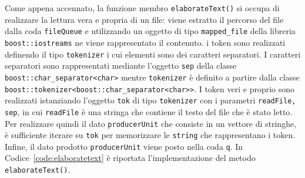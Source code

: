 \documentclass[10pt,twocolumn,letterpaper]{article}
\begin{document}
Come appena accennato, la funzione membro \texttt{elaborateText()} si occupa di realizzare la lettura vera e propria di un file: viene estratto il percorso del file dalla coda
\texttt{fileQueue} e utilizzando un oggetto di tipo \texttt{mapped\_file} della libreria \texttt{boost::iostreams} ne viene rappresentato il contenuto. i token sono realizzati definendo il tipo \texttt{tokenizer}
i cui elementi sono dei caratteri separatori. I caratteri separatori sono rappresentati mediante l'oggetto \texttt{sep} della classe \texttt{boost::char\_separator<char>} mentre \texttt{tokenizer} è 
definito a partire dalla classe \texttt{boost::tokenizer<boost::char\_separator<char>>}. I token veri e proprio sono realizzati istanziando l'oggetto \texttt{tok} di tipo \texttt{tokenizer} con i 
parametri \texttt{{readFile, sep}}, in cui \texttt{readFile} è una stringa che contiene il testo del file che è stato letto. Per realizzare quindi il dato \texttt{producerUnit} che consiste in un 
vettore di stringhe, è sufficiente iterare su \texttt{tok} per memorizzare le \texttt{string} che rappresentano i token. Infine, il dato prodotto \texttt{producerUnit} viene posto nella coda \texttt{q}. In Codice~\ref{code:elaboratetext} è riportata l'implementazione del metodo \texttt{elaborateText()}.


\end{document}
